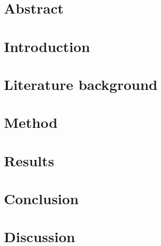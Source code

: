 \documentclass[a4paper, 12pt]{report}
\begin{document}
\setcounter{page}{1}
\pagestyle{plain} 

\chapter*{Abstract}


{
    \tableofcontents
}


\chapter{Introduction}
\label{ch:introduction}


\chapter{Literature background}
\label{ch:literature}


\chapter{Method}
\label{ch:method}


\chapter{Results}
\label{ch:results}


\chapter{Conclusion}
\label{ch:conclusion}


\chapter{Discussion}
\label{ch:discussion}




\end{document}
